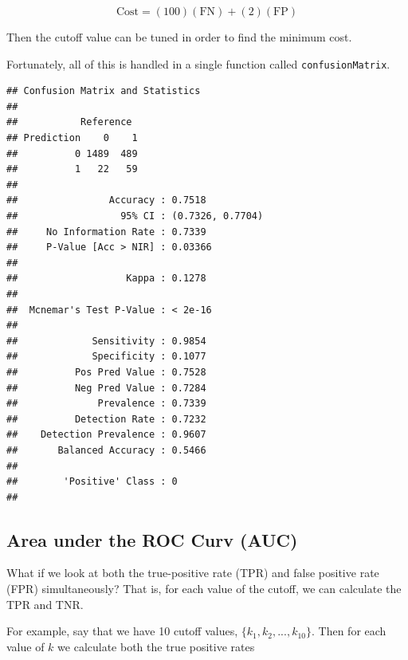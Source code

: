 \documentclass[]{book}
\newenvironment{Shaded}{\begin{snugshade}}{\end{snugshade}}
\newcommand{\KeywordTok}[1]{\textcolor[rgb]{0.13,0.29,0.53}{\textbf{#1}}}
\newcommand{\NormalTok}[1]{#1}
\newcommand{\OperatorTok}[1]{\textcolor[rgb]{0.81,0.36,0.00}{\textbf{#1}}}
\begin{document}
\[\text{Cost} = (100)(\text{FN}) + (2)(\text{FP})\]

Then the cutoff value can be tuned in order to find the minimum cost.

Fortunately, all of this is handled in a single function called \texttt{confusionMatrix}.

\begin{Shaded}
\end{Shaded}

\begin{verbatim}
## Confusion Matrix and Statistics
## 
##           Reference
## Prediction    0    1
##          0 1489  489
##          1   22   59
##                                           
##                Accuracy : 0.7518          
##                  95% CI : (0.7326, 0.7704)
##     No Information Rate : 0.7339          
##     P-Value [Acc > NIR] : 0.03366         
##                                           
##                   Kappa : 0.1278          
##                                           
##  Mcnemar's Test P-Value : < 2e-16         
##                                           
##             Sensitivity : 0.9854          
##             Specificity : 0.1077          
##          Pos Pred Value : 0.7528          
##          Neg Pred Value : 0.7284          
##              Prevalence : 0.7339          
##          Detection Rate : 0.7232          
##    Detection Prevalence : 0.9607          
##       Balanced Accuracy : 0.5466          
##                                           
##        'Positive' Class : 0               
## 
\end{verbatim}

\hypertarget{area-under-the-roc-curv-auc}{%
\subsection{Area under the ROC Curv (AUC)}\label{area-under-the-roc-curv-auc}}

What if we look at both the true-positive rate (TPR) and false positive rate (FPR) simultaneously? That is, for each value of the cutoff, we can calculate the TPR and TNR.

For example, say that we have 10 cutoff values, \(\{k_1, k_2, ..., k_{10}\}\). Then for each value of \(k\) we calculate both the true positive rates
\end{document}
